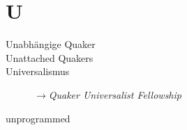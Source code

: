 \section*{U}

\articlesize

\begin{description}

\item[Unabhängige Quaker]

\item[Unattached Quakers]

 \item[Universalismus] $\to$\textit{Quaker Universalist Fellowship}

  \item[unprogrammed]
  
 \end{description}
\normalsize
